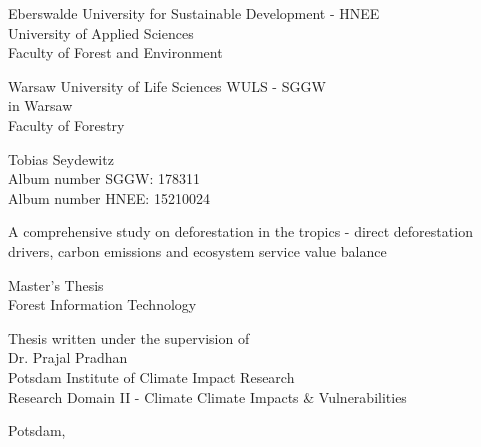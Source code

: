 \begin{titlepage}
	\begin{singlespace}
		\begin{center}
			\Large{Eberswalde University for Sustainable Development - HNEE}\\
			\Large{University of Applied Sciences}\\
			\Large{Faculty of Forest and Environment}
			
			\smallskip

			\Large{Warsaw University of Life Sciences WULS - SGGW}\\
			\Large{in Warsaw}\\
			\Large{Faculty of Forestry}

			\bigskip

			\large{Tobias Seydewitz}\\
			\normalsize{Album number SGGW: 178311}\\
			\normalsize{Album number HNEE: 15210024}

			\vspace{2cm}
 
			 \huge{A comprehensive study on deforestation in the tropics - direct deforestation drivers, carbon emissions and ecosystem service value balance}

			\bigskip

			\large{Master's Thesis}\\
			\large{Forest Information Technology}

			\vspace{2cm}

			\begin{flushright}
				\normalsize{Thesis written under the supervision of}\\
				\normalsize{Dr. Prajal Pradhan}\\
				\normalsize{Potsdam Institute of Climate Impact Research}\\
				\normalsize{Research Domain II - Climate Climate Impacts \& Vulnerabilities}
			\end{flushright}

			\vspace{3cm}

			\normalsize{Potsdam, \the\year}
		\end{center}
	\end{singlespace}
\end{titlepage}